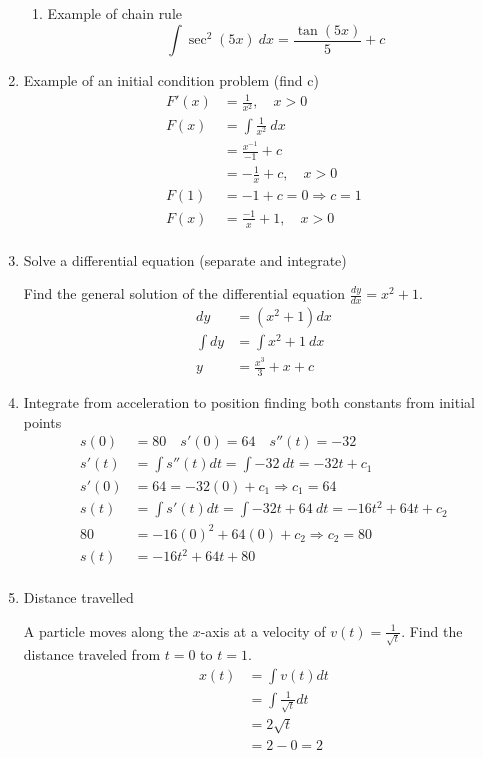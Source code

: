 \documentclass[fleqn]{article}
\begin{document}
\begin{enumerate}
\begin{enumerate}
\item Example of chain rule
\begin{equation*}
\int \sec^2 (5x) \ dx = \frac{\tan (5x)}{5} + c
\end{equation*}
\end{enumerate}

\item Example of an initial condition problem (find c)
\begin{align*}
F'(x) &= \frac{1}{x^2}, \quad x>0\\
F(x) &= \int \frac{1}{x^2} \ dx\\
&= \frac{x^{-1}}{-1} + c\\
&= -\frac{1}{x} + c, \quad x>0\\
F(1) &= -1 + c = 0  \Rightarrow c=1\\
 F(x) &= \frac{-1}{x} + 1, \quad x>0\\
\end{align*}

\item Solve a differential equation (separate and integrate)

Find the general solution of the differential equation $\frac{dy}{dx} = x^2 + 1$.
\begin{align*}
dy &= (x^2 + 1)dx\\
\int dy &= \int x^2 + 1 \ dx\\
y &= \frac{x^3}{3} + x + c
\end{align*}

\item Integrate from acceleration to position finding both constants from initial points
\begin{align*}
s(0) &= 80 \quad s'(0)=64 \quad s''(t)=-32 \\
s'(t) & = \int s''(t)dt = \int -32 \ dt = -32t + c_1\\
s'(0) & = 64 = -32(0) + c_1 \Rightarrow c_1 = 64\\
s(t) &= \int s'(t)dt = \int -32t + 64 \ dt = -16t^2 + 64t + c_2\\
80 &= -16(0)^2 + 64(0) + c_2 \Rightarrow c_2 = 80\\
s(t) & = -16t^2 + 64t + 80\\
\end{align*}

\item Distance travelled

A particle moves along the $x$-axis at a velocity of $v(t) = \frac{1}{\sqrt{t}}$. Find the distance traveled from $t=0$ to $t=1$.
\begin{align*}
x(t) &= \int v(t)dt\\
&= \int \frac{1}{\sqrt{t}}dt\\
&= 2\sqrt{t}\\
&= 2 - 0 = 2\\
\end{align*}


\end{enumerate}
\end{document}
